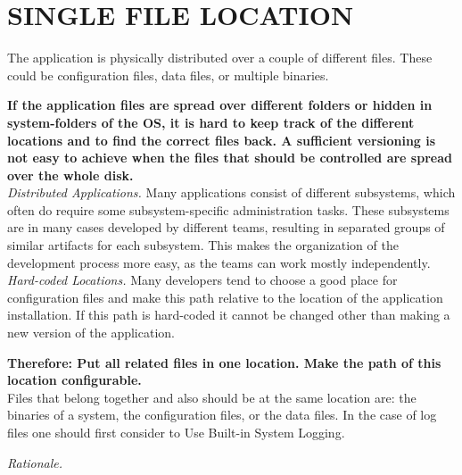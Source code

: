 \newpage
\section*{SINGLE FILE LOCATION}

The application is physically distributed over a couple of different files. These could be configuration files, data files, or multiple binaries. 

\begin{center}
  
\end{center}

\textbf{If the application files are spread over different folders or hidden in system-folders of the OS, it is hard to keep track of the different locations and to find the correct files back. A sufficient versioning is not easy to achieve when the files that should be controlled are spread over the whole disk.}\\

\textit{Distributed Applications.} Many applications consist of different subsystems, which often do require some subsystem-specific administration tasks. These subsystems are in many cases developed by different teams, resulting in separated groups of similar artifacts for each subsystem. This makes the organization of the development process more easy, as the teams can work mostly independently.\\

\textit{Hard-coded Locations.} Many developers tend to choose a good place for configuration files and make this path relative to the location of the application installation. If this path is hard-coded it cannot be changed other than making a new version of the application.

\begin{center}
   
\end{center}

\textbf{Therefore: Put all related files in one location. Make the path of this location configurable.}\\

Files that belong together and also should be at the same location are: the binaries of a system, the configuration files, or the data files. In the case of log files one should first consider to {\sc Use Built-in System Logging}.

 
\begin{center}
   
\end{center}

\textit{Rationale.}
